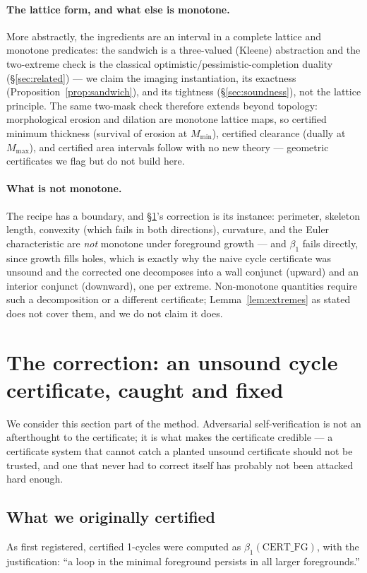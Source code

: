 \documentclass[10pt]{article}
\newcommand{\CFG}{\mathrm{CERT\_FG}}
\begin{document}
\paragraph{The lattice form, and what else is monotone.} More
abstractly, the ingredients are an interval in a complete lattice and
monotone predicates: the sandwich is a three-valued (Kleene) abstraction
and the two-extreme check is the classical
optimistic/pessimistic-completion duality (\S\ref{sec:related}) --- we
claim the imaging instantiation, its exactness
(Proposition~\ref{prop:sandwich}), and its tightness
(\S\ref{sec:soundness}), not the lattice principle. The same two-mask
check therefore extends beyond topology: morphological erosion and
dilation are monotone lattice maps, so certified minimum thickness
(survival of erosion at $M_{\min}$), certified clearance (dually at
$M_{\max}$), and certified area intervals follow with no new theory ---
geometric certificates we flag but do not build here.

\paragraph{What is not monotone.} The recipe has a boundary, and
\S\ref{sec:correction}'s correction is its instance: perimeter, skeleton
length, convexity (which fails in both directions), curvature, and the
Euler characteristic are \emph{not} monotone under foreground growth ---
and $\beta_1$ fails directly, since growth fills holes, which is exactly why the naive
cycle certificate was unsound and the corrected one decomposes into a
wall conjunct (upward) and an interior conjunct (downward), one per
extreme. Non-monotone quantities require such a decomposition or a
different certificate; Lemma~\ref{lem:extremes} as stated does not cover
them, and we do not claim it does.

\section{The correction: an unsound cycle certificate, caught and
fixed}\label{sec:correction}

We consider this section part of the method. Adversarial
self-verification is not an afterthought to the certificate; it is what
makes the certificate credible --- a certificate system that cannot catch
a planted unsound certificate should not be trusted, and one that never
had to correct itself has probably not been attacked hard enough.

\subsection{What we originally certified}
As first registered, certified 1-cycles were computed as $\beta_1(\CFG)$,
with the justification: ``a loop in the minimal foreground persists in
all larger foregrounds.''
\end{document}
